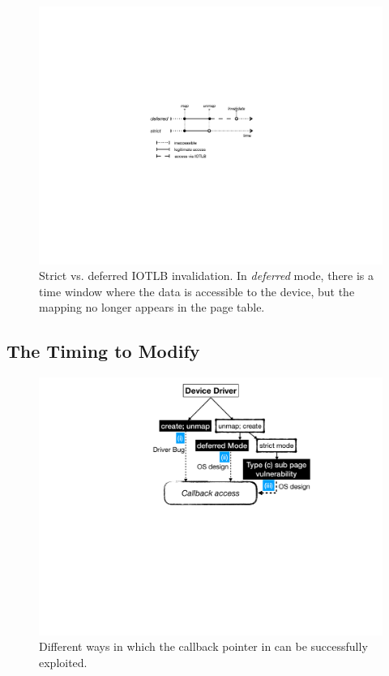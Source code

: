 \begin{figure}[t]
    \centering
    \includegraphics[width=0.75\columnwidth]{figs/strict.pdf}
    \caption{Strict vs. deferred IOTLB invalidation. In \emph{deferred} mode, there is a time window where the data is accessible to the device, but the mapping no longer appears in the page table.}
    \label{fig:deferred}
\end{figure}

\subsection{The Timing to Modify \shinfo}\label{sec:shinfo}

\begin{figure}[t]
    \centering
    \includegraphics[width=0.75\linewidth]{figs/road_to_op.pdf}
    \caption{Different ways in which the callback pointer in \shinfo can be successfully exploited.}
    \label{fig:road_to_op}
\end{figure}

